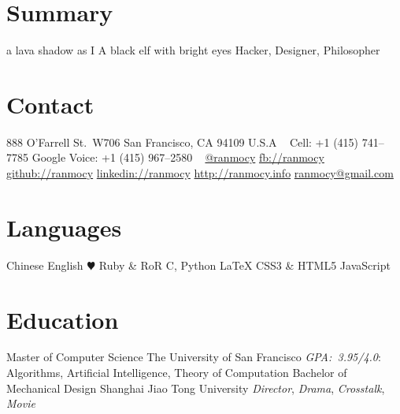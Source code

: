 \documentclass[]{friggeri-cv} %
\begin{document}


\begin{aside} %
  \section{Summary}
  a lava shadow as I
  A black elf
  with bright eyes
  Hacker,
  Designer,
  Philosopher
  \section{Contact}
  888 O'Farrell St.\ W706
  San Francisco, CA 94109
  U.S.A
  ~
  Cell:
  +1 (415) 741--7785
  Google Voice:
  +1 (415) 967--2580
  ~
  \href{https://twitter.com/ranmocy}{@ranmocy}
  \href{https://facebook.com/ranmocy}{fb://ranmocy}
  \href{https://github.com/ranmocy}{github://ranmocy}
  \href{http://www.linkedin.com/in/ranmocy}{linkedin://ranmocy}
  \href{http://ranmocy.info}{http://ranmocy.info}
  \href{mailto:ranmocy@gmail.com}{ranmocy@gmail.com}
  \section{Languages}
  Chinese
  English
  {\color{red} $\varheartsuit$} Ruby \& RoR
  C, Python
  LaTeX
  CSS3 \& HTML5
  JavaScript
\end{aside}


\section{Education}

\begin{entrylist}
  {Master \textnormal{of Computer Science}}
  {The University of San Francisco}
  {
    \emph{GPA:~3.95/4.0}: Algorithms, Artificial Intelligence, Theory of Computation
  }
  {Bachelor \textnormal{of Mechanical Design}}
  {Shanghai Jiao Tong University}
  {
    \emph{Director}, \emph{Drama}, \emph{Crosstalk}, \emph{Movie}
  }
\end{entrylist}
\end{document}
